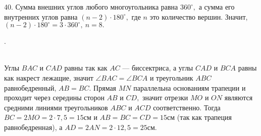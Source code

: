 40. Сумма внешних углов любого многоугольника равна $360^\circ,$ а сумма его внутренних углов равна $(n-2)\cdot180^\circ,$ где $n$ это количество вершин. Значит, $(n-2)\cdot180^\circ=3\cdot360^\circ,\ n=8.$\newpage

. \begin{figure}[ht!]
\end{figure}\\
Углы $BAC$ и $CAD$ равны так как $AC$ --- биссектриса, а углы $CAD$ и $BCA$ равны как накрест лежащие, значит $\angle BAC=\angle BCA$ и треугольник $ABC$ равнобедренный, $AB=BC.$ Прямая $MN$ параллельна основаниям трапеции и проходит через середины сторон $AB$ и $CD,$ значит отрезки $MO$ и $ON$ являются средними линиями треугольников $ABC$ и $ACD$ соответственно. Тогда $BC=2MO=2\cdot7,5=15$см и $AB=BC=CD=15$см (так как трапеция равнобедренная), а $AD=2AN=2\cdot12,5=25$см.\\
